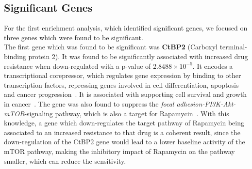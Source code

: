
\subsection{Significant Genes}\label{subsec:rapamycin_genes}
For the first enrichment analysis, which identified significant genes, we focused on three genes which were found to be significant.\\
The first gene which was found to be significant was \textbf{CtBP2} (Carboxyl terminal-binding protein 2). It was found to be significantly associated with increased drug resistance when down-regulated with a p-value of $2.8488\times10^{-5}$. It encodes a transcriptional corepressor, which regulates gene expression by binding to other transcription factors, repressing genes involved in cell differentiation, apoptosis and cancer progression~\cite{ctbp2_transcriptional_corepressor}. It is associated with supporting cell survival and growth in cancer~\cite{ctbp2_transcriptional_corepressor}. The gene was also found to suppress the \emph{focal adhesion-PI3K-Akt-mTOR}-signaling pathway, which is also a target for Rapamycin~\cite{ctbp2_mtor}. With this knowledge, a gene which down-regulates the target pathway of Rapamycin being associated to an increased resistance to that drug is a coherent result, since the down-regulation of the CtBP2 gene would lead to a lower baseline activity of the mTOR pathway, making the inhibitory impact of Rapamycin on the pathway smaller, which can reduce the sensitivity.\\
